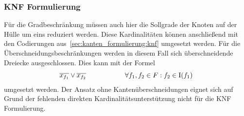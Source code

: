 \subsubsection{KNF Formulierung}
\label{sec:dreiecks_formulierung:knf}
Für die Gradbeschränkung müssen auch hier die Sollgrade der Knoten auf der Hülle um eins reduziert werden.
Diese Kardinalitäten können anschließend mit den Codierungen aus~\cref{sec:kanten_formulierung:knf} umgesetzt werden.
Für die Überschneidungsbeschränkungen werden in diesem Fall sich überschneidende Dreiecke ausgeschlossen.
Dies kann mit der Formel 
\[\overline{x_{f_1}} \lor \overline{x_{f_2}} \hspace{2cm} \forall f_1, f_2 \in F: f_2 \in \operatorname{I}(f_1)\]
umgesetzt werden.
Der Ansatz ohne Kantenüberschneidungen eignet sich auf Grund der fehlenden direkten Kardinalitätsunterstützung nicht für die KNF Formulierung.







